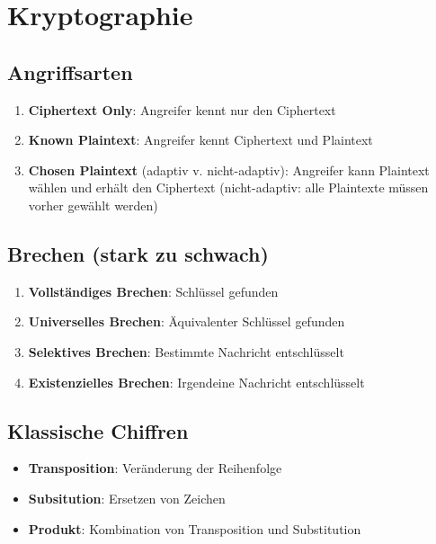 \documentclass{article}
\author{Leopold Lemmermann}
\begin{document}
\createtitle



\section{Kryptographie}

\subsection{Angriffsarten}
\begin{enumerate}
  \item \textbf{Ciphertext Only}: Angreifer kennt nur den Ciphertext
  \item \textbf{Known Plaintext}: Angreifer kennt Ciphertext und Plaintext
  \item \textbf{Chosen Plaintext} (adaptiv v. nicht-adaptiv): Angreifer kann Plaintext wählen und erhält den Ciphertext (nicht-adaptiv: alle Plaintexte müssen vorher gewählt werden)
\end{enumerate}

\subsection{Brechen (stark zu schwach)}
\begin{enumerate}
  \item \textbf{Vollständiges Brechen}: Schlüssel gefunden
  \item \textbf{Universelles Brechen}: Äquivalenter Schlüssel gefunden
  \item \textbf{Selektives Brechen}: Bestimmte Nachricht entschlüsselt
  \item \textbf{Existenzielles Brechen}: Irgendeine Nachricht entschlüsselt
\end{enumerate}

\subsection{Klassische Chiffren}
\begin{itemize}
  \item \textbf{Transposition}: Veränderung der Reihenfolge
  \item \textbf{Subsitution}: Ersetzen von Zeichen
  \item \textbf{Produkt}: Kombination von Transposition und Substitution
\end{itemize}
\end{document}
